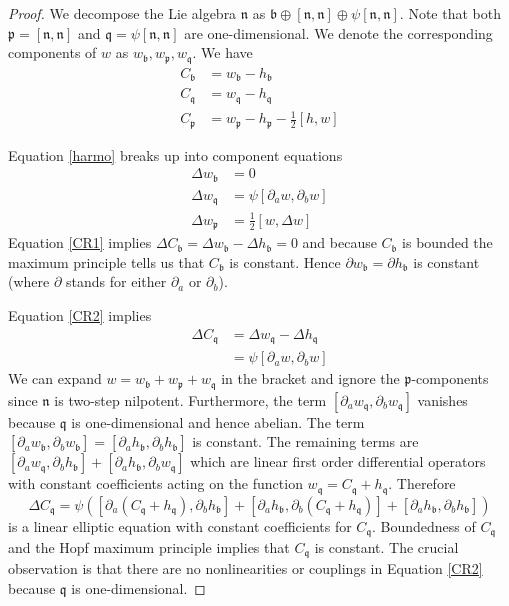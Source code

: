\documentclass[11pt]{amsart}
\newcommand{\nn}{\mathfrak{n}}
\newcommand{\bb}{\mathfrak{b}}
\newcommand{\pp}{\mathfrak{p}}
\newcommand{\qq}{\mathfrak{q}}
\numberwithin{equation}{section}
\theoremstyle{definition}
\theoremstyle{remark}
\begin{document}
\begin{proof}

We decompose the Lie algebra $\nn$ as $\bb\oplus[\nn,\nn]\oplus\psi[\nn,\nn]$. Note that both $\pp=[\nn,\nn]$ and $\qq=\psi[\nn,\nn]$ are one-dimensional. We denote the corresponding components of $w$ as $w_{\bb},w_{\pp},w_{\qq}$. We have
\begin{align*}
C_{\bb}&=w_{\bb}-h_{\bb}\\
C_{\qq}&=w_{\qq}-h_{\qq}\\
C_{\pp}&=w_{\pp}-h_{\pp}-\frac{1}{2}[h,w]
\end{align*}

\par Equation \eqref{harmo} breaks up into component equations
\begin{align}
\label{CR1}\Delta w_{\bb}&=0\\
\label{CR2}\Delta w_{\qq}&=\psi[\partial_aw,\partial_bw]\\
\label{CR3}\Delta w_{\pp}&=\frac{1}{2}[w,\Delta w]
\end{align}
Equation \eqref{CR1} implies $\Delta C_{\bb}=\Delta w_{\bb}-\Delta h_{\bb}=0$ and because $C_{\bb}$ is bounded the maximum principle tells us that $C_{\bb}$ is constant. Hence $\partial w_{\bb}=\partial h_{\bb}$ is constant (where $\partial$ stands for either $\partial_a$ or $\partial_b$).

Equation \eqref{CR2} implies
\begin{align*}
\Delta C_{\qq}&=\Delta w_{\qq}-\Delta h_{\qq}\\
&=\psi[\partial_aw,\partial_bw]
\end{align*}
We can expand $w=w_{\bb}+w_{\pp}+w_{\qq}$ in the bracket and ignore the $\pp$-components since $\nn$ is two-step nilpotent. Furthermore, the term $[\partial_aw_{\qq},\partial_bw_{\qq}]$ vanishes because $\qq$ is one-dimensional and hence abelian. The term $[\partial_aw_{\bb},\partial_bw_{\bb}]=[\partial_ah_{\bb},\partial_bh_{\bb}]$ is constant. The remaining terms are $[\partial_aw_{\qq},\partial_bh_{\bb}]+[\partial_ah_{\bb},\partial_bw_{\qq}]$ which are linear first order differential operators with constant coefficients acting on the function $w_{\qq}=C_{\qq}+h_{\qq}$. Therefore
\[\Delta C_{\qq}=\psi\left([\partial_a(C_{\qq}+h_{\qq}),\partial_bh_{\bb}]+[\partial_ah_{\bb},\partial_b(C_{\qq}+h_{\qq})]+[\partial_ah_{\bb},\partial_bh_{\bb}]\right)\]
is a linear elliptic equation with constant coefficients for $C_{\qq}$. Boundedness of $C_{\qq}$ and the Hopf maximum principle \cite[Theorem 3.1]{GT} implies that $C_{\qq}$ is constant. The crucial observation is that there are no nonlinearities or couplings in Equation \eqref{CR2} because $\qq$ is one-dimensional.


\end{proof}
\end{document}
